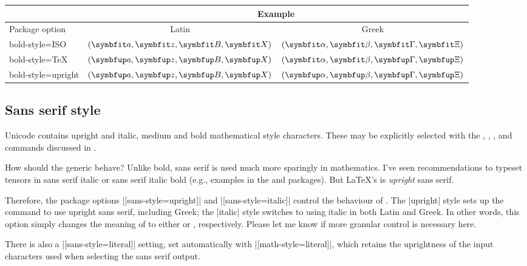 \begin{table}
  \centering
  \begin{tabular}{@{}>{\ttfamily}lcc@{}}
    \toprule
      & \multicolumn{2}{c}{Example} \\
       \cmidrule(l){2-3}
      \rmfamily Package option & Latin & Greek \\
    \midrule
      bold-style=ISO & $(\symbfit a, \symbfit z, \symbfit B, \symbfit X)$ & $(\symbfit\alpha, \symbfit\beta, \symbfit\Gamma, \symbfit\Xi)$ \\
      bold-style=TeX & $(\symbfup a,\symbfup z,\symbfup B,\symbfup X)$ & $(\symbfit\alpha, \symbfit\beta,\symbfup \Gamma,\symbfup \Xi)$ \\
      bold-style=upright & $(\symbfup a,\symbfup z,\symbfup B,\symbfup X)$ & $(\symbfup \alpha,\symbfup \beta,\symbfup \Gamma,\symbfup \Xi)$ \\
    \bottomrule
  \end{tabular}
\end{table}


\subsection{Sans serif style}

Unicode contains upright and italic, medium and bold mathematical style characters.
These may be explicitly selected with the , , , and 
commands discussed in .

How should the generic  behave? Unlike bold, sans serif is used much more sparingly
in mathematics. I've seen recommendations to typeset tensors in sans serif italic
or sans serif italic bold (e.g., examples in the  and  packages).
But \LaTeX's  is \textsl{upright} sans serif.

Therefore, the package options |[sans-style=upright]| and |[sans-style=italic]| control the behaviour of .
The |upright| style sets up the command to use upright sans serif, including Greek;
the |italic| style switches to using italic in both Latin and Greek.
In other words, this option simply changes the meaning of  to either  or , respectively.
Please let me know if more granular control is necessary here.

There is also a |[sans-style=literal]| setting, set automatically with |[math-style=literal]|, which retains the uprightness of the input characters used when selecting the sans serif output.

